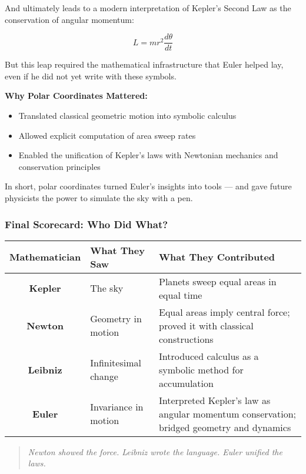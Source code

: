 And ultimately leads to a modern interpretation of Kepler’s Second Law as the conservation of angular momentum:

\[
L = m r^2 \frac{d\theta}{dt}
\]

But this leap required the mathematical infrastructure that Euler helped lay, even if he did not yet write with these symbols.

\textbf{Why Polar Coordinates Mattered:}
\begin{itemize}
    \item Translated classical geometric motion into symbolic calculus
    \item Allowed explicit computation of area sweep rates
    \item Enabled the unification of Kepler’s laws with Newtonian mechanics and conservation principles
\end{itemize}

In short, polar coordinates turned Euler’s insights into tools — and gave future physicists the power to simulate the sky with a pen.



\subsubsection*{Final Scorecard: Who Did What?}

\begin{center}
\renewcommand{\arraystretch}{1.6}
\begin{tabular}{|c|p{4.5cm}|p{6.5cm}|}
\hline
\textbf{Mathematician} & \textbf{What They Saw} & \textbf{What They Contributed} \\ \hline
\textbf{Kepler} & The sky & Planets sweep equal areas in equal time \\ \hline
\textbf{Newton} & Geometry in motion & Equal areas imply central force; proved it with classical constructions \\ \hline
\textbf{Leibniz} & Infinitesimal change & Introduced calculus as a symbolic method for accumulation \\ \hline
\textbf{Euler} & Invariance in motion & Interpreted Kepler's law as angular momentum conservation; bridged geometry and dynamics \\ \hline
\end{tabular}
\end{center}

\begin{quote}
\textit{Newton showed the force. Leibniz wrote the language. Euler unified the laws.}
\end{quote}


